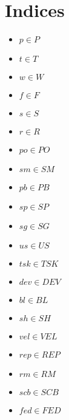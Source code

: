 \documentclass{article}
\begin{document}
\section{Indices}
\begin{itemize}
    \item $p \in P$
    \item $t \in T$
    \item $w \in W$
    \item $f \in F$
    \item $s \in S$
    \item $r \in R$
    \item $po \in PO$
    \item $sm \in SM$
    \item $pb \in PB$
    \item $sp \in SP$
    \item $sg \in SG$
    \item $us \in US$
    \item $tsk \in TSK$
    \item $dev \in DEV$
    \item $bl \in BL$
    \item $sh \in SH$
    \item $vel \in VEL$
    \item $rep \in REP$
    \item $rm \in RM$
    \item $scb \in SCB$
    \item $fed \in FED$
\end{itemize}
\end{document}
